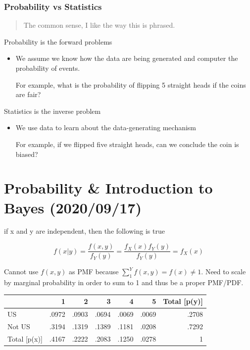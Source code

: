 \documentclass[11pt]{article}
\begin{document}
\subsubsection{Probability vs Statistics}
\label{sec:orgd30d67c}

\begin{quote}
The common sense, I like the way this is phrased.
\end{quote}

Probability is the forward problems
\begin{itemize}
\item We assume we know how the data are being generated and computer the
probability of events.

For example, what is the probability of flipping 5 straight heads if the coins
are fair?
\end{itemize}

Statistics is the inverse problem
\begin{itemize}
\item We use data to learn about the data-generating mechanism

For example, if we flipped five straight heads, can we conclude the coin is
biased?
\end{itemize}
\section{Probability \& Introduction to Bayes (2020/09/17)}
\label{sec:orge0f6307}


if x and y are independent, then the following is true

$$
f(x | y) = \frac{f(x, y)}{f_Y (y)} = \frac{f_X(x) f_Y (y)}{f_Y (y)} = f_X (x)
$$


Cannot use \(f(x,y)\) as PMF because \(\sum_{1}^{Y} f(x,y) = f(x) \neq 1\). Need to
scale by marginal probability in order to sum to 1 and thus be a proper PMF/PDF.

\begin{center}
\begin{tabular}{lrrrrrr}
 & 1 & 2 & 3 & 4 & 5 & Total [p(y)]\\
\hline
US & .0972 & .0903 & .0694 & .0069 & .0069 & .2708\\
Not US & .3194 & .1319 & .1389 & .1181 & .0208 & .7292\\
Total [p(x)] & .4167 & .2222 & .2083 & .1250 & .0278 & 1\\
\end{tabular}
\end{center}
\end{document}
